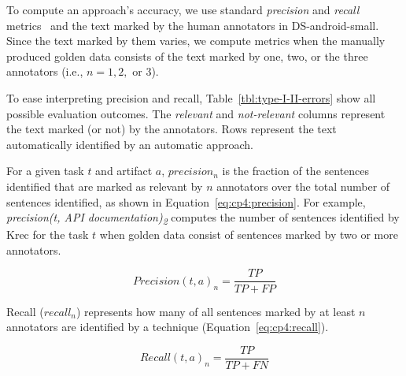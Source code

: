 To compute an approach's accuracy, we use standard \textit{precision} and \textit{recall} metrics~\cite{Manning2009IR} and the text marked by the human annotators in \acs{DS-android-small}.
Since the text marked by them varies, we compute metrics when the manually produced golden data consists of the text marked by one, two, or the three annotators (i.e., $n=1, 2,$ or $3$).




To ease interpreting precision and recall, Table~\ref{tbl:type-I-II-errors} show all possible evaluation outcomes. The \textit{relevant} and \textit{not-relevant} columns represent the text 
marked (or not) by the annotators. Rows represent the text automatically identified by an automatic approach.






For a given task $t$ and artifact $a$, $precision_n$ is the fraction of the sentences identified that are marked as relevant by $n$ annotators over the total number of sentences identified, as shown in Equation~\ref{eq:cp4:precision}. For example, \textit{precision(t, API documentation)\textsubscript{2}} computes the number of sentences identified by \acs{Krec} for the task $t$ when 
golden data consist of sentences marked by two or more annotators.


\begin{equation}
\label{eq:cp4:precision}    
    Precision(t, a)_n = \frac{TP}{TP + FP}
\end{equation}


Recall ($recall_n$) represents how many of all sentences marked by at least $n$ annotators are identified by a technique (Equation~\ref{eq:cp4:recall}).


\begin{equation}
\label{eq:cp4:recall}        
    Recall(t, a)_n = \frac{TP}{TP + FN}
\end{equation}







